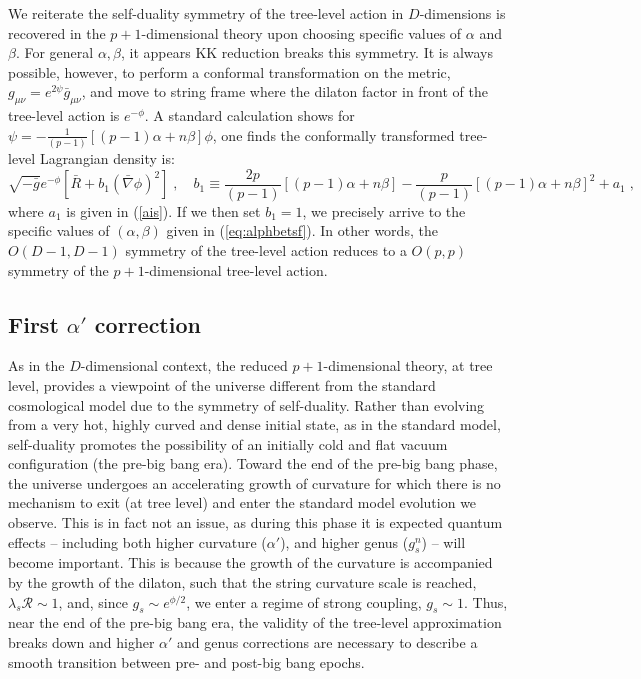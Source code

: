 \documentclass[amsmath,amssymb,11pt]{article}
\newcommand{\beq}{\begin{equation}}
\newcommand{\eeq}{\end{equation}}
\begin{document}


We reiterate the self-duality symmetry of the tree-level action in $D$-dimensions is recovered in the $p+1$-dimensional theory upon choosing specific values of $\alpha$ and $\beta$. For general $\alpha,\beta$, it appears KK reduction breaks this symmetry. It is always possible, however, to perform a conformal transformation on the metric, $g_{\mu\nu}=e^{2\psi}\bar{g}_{\mu\nu}$, and move to string frame where the dilaton factor in front of the tree-level action is $e^{-\phi}$. A standard calculation shows for $\psi=-\frac{1}{(p-1)}[(p-1)\alpha+n\beta]\phi$, one finds the conformally transformed tree-level Lagrangian density is:
\beq \sqrt{-\bar{g}}e^{-\phi}[\bar{R}+b_{1}(\bar{\nabla}\phi)^{2}]\;,\quad b_{1}\equiv\frac{2p}{(p-1)}[(p-1)\alpha+n\beta]-\frac{p}{(p-1)}[(p-1)\alpha+n\beta]^{2}+a_{1}\;,\eeq
where $a_{1}$ is given in (\ref{ais}). If we then set $b_{1}=1$, we precisely arrive to the specific values of $(\alpha,\beta)$ given in (\ref{eq:alphbetsf}). In other words, the $O(D-1,D-1)$ symmetry of the tree-level action reduces to a $O(p,p)$ symmetry of the $p+1$-dimensional tree-level action. 


\subsection*{First $\alpha'$ correction}

As in the $D$-dimensional context, the reduced $p+1$-dimensional theory, at tree level, provides a viewpoint of the universe different from the standard cosmological model due to the symmetry of self-duality. Rather than evolving from a very hot, highly curved and dense initial state, as in the standard model, self-duality promotes the possibility of an initially cold and flat vacuum configuration (the pre-big bang era). Toward the end of the pre-big bang phase, the universe undergoes an accelerating growth of curvature for which there is no mechanism to exit (at tree level) and enter the standard model evolution we observe. This is in fact not an issue, as during this phase it is expected quantum effects -- including both higher curvature ($\alpha'$), and higher genus ($g^{n}_{s}$) -- will become important. This is because the growth of the curvature is accompanied by the growth of the dilaton, such that the string curvature scale is reached, $\lambda_{s}\mathcal{R}\sim1$, and, since $g_{s}\sim e^{\phi/2}$, we enter a regime of strong coupling, $g_{s}\sim1$. Thus, near the end of the pre-big bang era, the validity of the tree-level approximation breaks down and higher $\alpha'$ and genus corrections are necessary to describe a smooth transition between pre- and post-big bang epochs.
\end{document}
